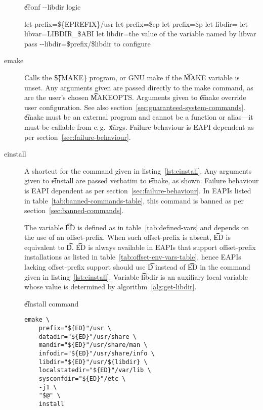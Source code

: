 \begin{description}
\begin{algorithm}
\caption{\t{econf -{}-libdir} logic} \label{alg:econf-libdir}
\begin{algorithmic}[1]
\STATE let prefix=\$\{EPREFIX\}/usr
    \STATE let prefix=\$ep
    \STATE let prefix=\$p
\ENDIF
\STATE let libdir=
    \STATE let libvar=LIBDIR_\$ABI
        \STATE let libdir=the value of the variable named by libvar
    \ENDIF
\ENDIF
{}
    \STATE pass -{}-libdir=\$prefix/\$libdir to configure
\ENDIF
\end{algorithmic}
\end{algorithm}

\item[emake] Calls the \t{\$\{MAKE\}} program, or GNU make if the \t{MAKE} variable is unset.
    Any arguments given are passed directly to the make command, as are the user's chosen
    \t{MAKEOPTS}\@. Arguments given to \t{emake} override user configuration. See also
    section~\ref{sec:guaranteed-system-commands}. \t{emake} must be an external program and cannot
    be a function or alias---it must be callable from e.\,g.\ \t{xargs}. Failure behaviour is EAPI
    dependent as per section~\ref{sec:failure-behaviour}.

\item[einstall] A shortcut for the command given in listing~\ref{lst:einstall}. Any arguments given
    to \t{einstall} are passed verbatim to \t{emake}, as shown. Failure behaviour is EAPI dependent
    as per section~\ref{sec:failure-behaviour}.
    In EAPIs listed in table~\ref{tab:banned-commands-table}, this command is banned as per
    section~\ref{sec:banned-commands}.

    The variable \t{ED} is defined as in table~\ref{tab:defined-vars} and depends on the use of an
    offset-prefix. When such offset-prefix is absent, \t{ED} is equivalent to \t{D}\@. \t{ED} is
    always available in EAPIs that support offset-prefix installations as listed in
    table~\ref{tab:offset-env-vars-table}, hence EAPIs lacking offset-prefix support should use
    \t{D} instead of \t{ED} in the command given in listing~\ref{lst:einstall}.
    Variable \t{libdir} is an auxiliary local variable whose value is determined by
    algorithm~\ref{alg:get-libdir}.

\begin{listing}[H]
\caption{\t{einstall} command} \label{lst:einstall}
\begin{verbatim}
emake \
    prefix="${ED}"/usr \
    datadir="${ED}"/usr/share \
    mandir="${ED}"/usr/share/man \
    infodir="${ED}"/usr/share/info \
    libdir="${ED}"/usr/${libdir} \
    localstatedir="${ED}"/var/lib \
    sysconfdir="${ED}"/etc \
    -j1 \
    "$@" \
    install
\end{verbatim}
\end{listing}

\end{description}

